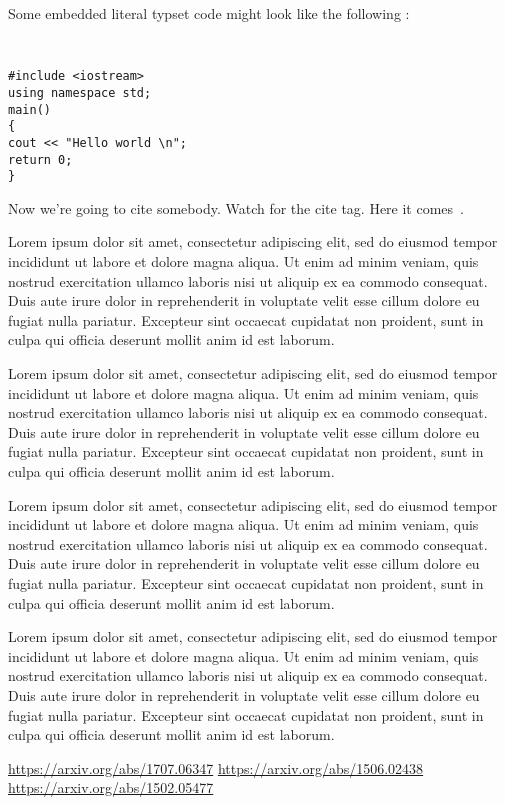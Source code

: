 \documentclass[letterpaper,twocolumn,10pt]{article}
\begin{document}
Some embedded literal typset code might 
look like the following :

{\tt \small
\begin{verbatim}
#include <iostream>
using namespace std;
main()
{
cout << "Hello world \n";
return 0;
}

\end{verbatim}
}

Now we're going to cite somebody.  Watch for the cite tag.
Here it comes~\cite{ppo}.  

Lorem ipsum dolor sit amet, consectetur adipiscing elit, sed do eiusmod tempor incididunt ut labore et dolore magna aliqua. Ut enim ad minim veniam, quis nostrud exercitation ullamco laboris nisi ut aliquip ex ea commodo consequat. Duis aute irure dolor in reprehenderit in voluptate velit esse cillum dolore eu fugiat nulla pariatur. Excepteur sint occaecat cupidatat non proident, sunt in culpa qui officia deserunt mollit anim id est laborum.

Lorem ipsum dolor sit amet, consectetur adipiscing elit, sed do eiusmod tempor incididunt ut labore et dolore magna aliqua. Ut enim ad minim veniam, quis nostrud exercitation ullamco laboris nisi ut aliquip ex ea commodo consequat. Duis aute irure dolor in reprehenderit in voluptate velit esse cillum dolore eu fugiat nulla pariatur. Excepteur sint occaecat cupidatat non proident, sunt in culpa qui officia deserunt mollit anim id est laborum.

Lorem ipsum dolor sit amet, consectetur adipiscing elit, sed do eiusmod tempor incididunt ut labore et dolore magna aliqua. Ut enim ad minim veniam, quis nostrud exercitation ullamco laboris nisi ut aliquip ex ea commodo consequat. Duis aute irure dolor in reprehenderit in voluptate velit esse cillum dolore eu fugiat nulla pariatur. Excepteur sint occaecat cupidatat non proident, sunt in culpa qui officia deserunt mollit anim id est laborum.

Lorem ipsum dolor sit amet, consectetur adipiscing elit, sed do eiusmod tempor incididunt ut labore et dolore magna aliqua. Ut enim ad minim veniam, quis nostrud exercitation ullamco laboris nisi ut aliquip ex ea commodo consequat. Duis aute irure dolor in reprehenderit in voluptate velit esse cillum dolore eu fugiat nulla pariatur. Excepteur sint occaecat cupidatat non proident, sunt in culpa qui officia deserunt mollit anim id est laborum.

\theendnotes

\begin{thebibliography}{9}
\url{https://arxiv.org/abs/1707.06347}
\url{https://arxiv.org/abs/1506.02438}
\url{https://arxiv.org/abs/1502.05477}
\end{thebibliography}
\end{document}
